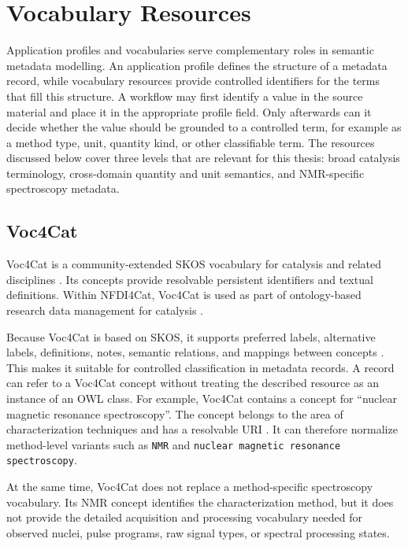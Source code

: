 \section{Vocabulary Resources}
\label{sec:vocabulary-resources}

Application profiles and vocabularies serve complementary roles in semantic metadata modelling.
An application profile defines the structure of a metadata record, while vocabulary resources provide controlled identifiers for the terms that fill this structure.
A workflow may first identify a value in the source material and place it in the appropriate profile field.
Only afterwards can it decide whether the value should be grounded to a controlled term, for example as a method type, unit, quantity kind, or other classifiable term.
The resources discussed below cover three levels that are relevant for this thesis: broad catalysis terminology, cross-domain quantity and unit semantics, and NMR-specific spectroscopy metadata.

\subsection{Voc4Cat}
\label{sec:voc4cat}

\ac{Voc4Cat} is a community-extended \ac{SKOS} vocabulary for catalysis and related disciplines \cite{david_linke_2023_8313340}.
Its concepts provide resolvable persistent identifiers and textual definitions.
Within \ac{NFDI4Cat}, \ac{Voc4Cat} is used as part of ontology-based research data management for catalysis \cite{nfdi4cat2024whitepaper}.

Because \ac{Voc4Cat} is based on \ac{SKOS}, it supports preferred labels, alternative labels, definitions, notes, semantic relations, and mappings between concepts \cite{w3c2009skos}.
This makes it suitable for controlled classification in metadata records.
A record can refer to a \ac{Voc4Cat} concept without treating the described resource as an instance of an \ac{OWL} class.
For example, \ac{Voc4Cat} contains a concept for \enquote{nuclear magnetic resonance spectroscopy}.
The concept belongs to the area of characterization techniques and has a resolvable URI \cite{david_linke_2023_8313340}.
It can therefore normalize method-level variants such as \texttt{NMR} and \texttt{nuclear magnetic resonance spectroscopy}.

At the same time, \ac{Voc4Cat} does not replace a method-specific spectroscopy vocabulary.
Its NMR concept identifies the characterization method, but it does not provide the detailed acquisition and processing vocabulary needed for observed nuclei, pulse programs, raw signal types, or spectral processing states.

